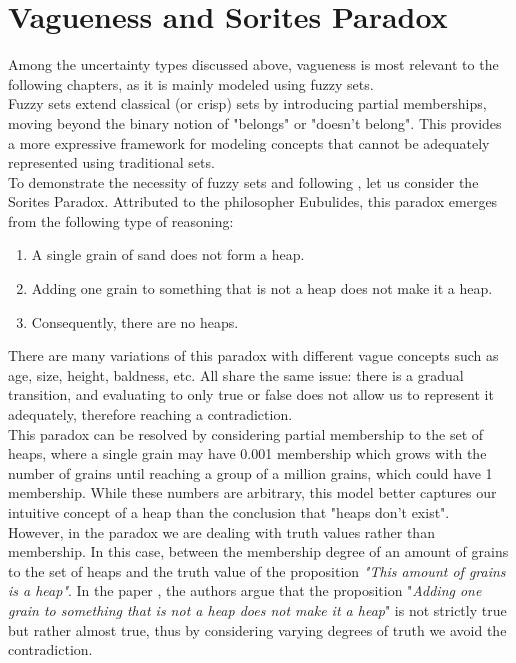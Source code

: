 \section{Vagueness and Sorites Paradox}
\label{sec:sorites}

Among the uncertainty types discussed above, vagueness is most relevant to the following chapters, as it is mainly modeled using fuzzy sets.\\

Fuzzy sets extend classical (or crisp) sets by introducing partial memberships, moving beyond the binary notion of "belongs" or "doesn't belong". This provides a more expressive framework for modeling concepts that cannot be adequately represented using traditional sets.\\

To demonstrate the necessity of fuzzy sets and following \cite{HájekSorites}, let us consider the Sorites Paradox. Attributed to the philosopher Eubulides, this paradox emerges from the following type of reasoning:

\begin{enumerate}
    \item A single grain of sand does not form a heap.
    \item Adding one grain to something that is not a heap does not make it a heap.
    \item Consequently, there are no heaps.
\end{enumerate}


There are many variations of this paradox with different vague concepts such as age, size, height, baldness, etc. All share the same issue: there is a gradual transition, and evaluating to only true or false does not allow us to represent it adequately, therefore reaching a contradiction.\\

This paradox can be resolved by considering partial membership to the set of heaps, where a single grain may have 0.001 membership which grows with the number of grains until reaching a group of a million grains, which could have 1 membership. While these numbers are arbitrary, this model better captures our intuitive concept of a heap than the conclusion that "heaps don't exist".\\

However, in the paradox we are dealing with truth values rather than membership. In this case,  between the membership degree of an amount of grains to the set of heaps and the truth value of the proposition \textit{"This amount of grains is a heap"}. In the paper \cite{HájekSorites}, the authors argue that the proposition "\textit{Adding one grain to something that is not a heap does not make it a heap}" is not strictly true but rather almost true, thus by considering varying degrees of truth we avoid the contradiction.\\

